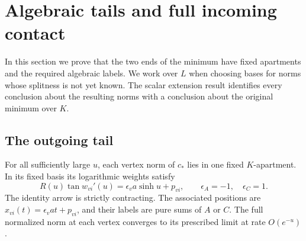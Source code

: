 \section{Algebraic tails and full incoming contact}\label{sec:tails}

In this section we prove that the two ends of the minimum have fixed
apartments and the required algebraic labels. We work over $L$ when
choosing bases for norms whose splitness is not yet known. The scalar
extension result identifies every conclusion about the resulting norms
with a conclusion about the original minimum over $K$.

\subsection{The outgoing tail}

\begin{proposition}\label{prop:outgoingtail}
For all sufficiently large $u$, each vertex norm of $c_*$ lies in one
fixed $K$-apartment. In its fixed basis its logarithmic weights satisfy
\begin{equation}\label{eq:outgoingequation}
 R(u)\tan w_{vi}'(u)=\epsilon_v a\sinh u+p_{vi},
 \qquad \epsilon_A=-1,\quad\epsilon_C=1.
\end{equation}
The identity arrow is strictly contracting. The associated positions are
$x_{vi}(t)=\epsilon_v at+p_{vi}$, and their labels are pure sums of $A$
or $C$. The full normalized norm at each vertex converges to its
prescribed limit at rate $O(e^{-u})$.
\end{proposition}

